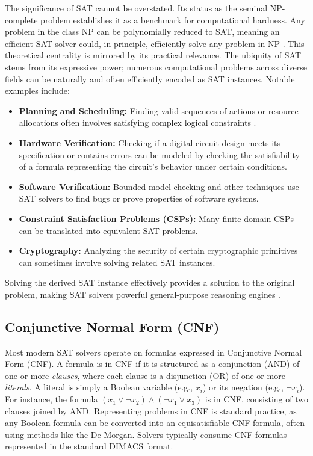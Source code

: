 \documentclass[12pt, a4paper]{article}
\begin{document}
The significance of SAT cannot be overstated. Its status as the seminal NP-complete problem establishes it as a benchmark for computational hardness. Any problem in the class NP can be polynomially reduced to SAT, meaning an efficient SAT solver could, in principle, efficiently solve any problem in NP \cite{Cook1971}. This theoretical centrality is mirrored by its practical relevance. The ubiquity of SAT stems from its expressive power; numerous computational problems across diverse fields can be naturally and often efficiently encoded as SAT instances. Notable examples include:
\begin{itemize}
    \item \textbf{Planning and Scheduling:} Finding valid sequences of actions or resource allocations often involves satisfying complex logical constraints \cite{Autoblocks}.
    \item \textbf{Hardware Verification:} Checking if a digital circuit design meets its specification or contains errors can be modeled by checking the satisfiability of a formula representing the circuit's behavior under certain conditions.
    \item \textbf{Software Verification:} Bounded model checking and other techniques use SAT solvers to find bugs or prove properties of software systems.
    \item \textbf{Constraint Satisfaction Problems (CSPs):} Many finite-domain CSPs can be translated into equivalent SAT problems.
    \item \textbf{Cryptography:} Analyzing the security of certain cryptographic primitives can sometimes involve solving related SAT instances.
\end{itemize}
Solving the derived SAT instance effectively provides a solution to the original problem, making SAT solvers powerful general-purpose reasoning engines \cite{Autoblocks}.

\subsection{Conjunctive Normal Form (CNF)}
\label{subsec:cnf}

Most modern SAT solvers operate on formulas expressed in Conjunctive Normal Form (CNF). A formula is in CNF if it is structured as a conjunction (AND) of one or more \emph{clauses}, where each clause is a disjunction (OR) of one or more \emph{literals}. A literal is simply a Boolean variable (e.g., $x_i$) or its negation (e.g., $\lnot x_i$). For instance, the formula $(x_1 \lor \lnot x_2) \land (\lnot x_1 \lor x_3)$ is in CNF, consisting of two clauses joined by AND. Representing problems in CNF is standard practice, as any Boolean formula can be converted into an equisatisfiable CNF formula, often using methods like the De Morgan. Solvers typically consume CNF formulas represented in the standard DIMACS format.
\end{document}
